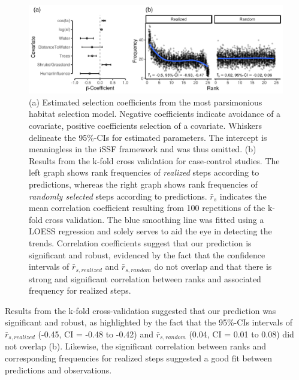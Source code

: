 \documentclass[abstract=on,10pt,a4paper,bibliography=totocnumbered]{scrartcl}
\begin{document}
\begin{figure}[h]
  \begin{center}
    \includegraphics[width = \textwidth]{99_PermeabilityResults.pdf}
    \caption{(a) Estimated selection coefficients from the most parsimonious
    habitat selection model. Negative coefficients indicate avoidance of a
    covariate, positive coefficients selection of a covariate. Whiskers
    delineate the 95\%-CIs for estimated parameters. The intercept is
    meaningless in the iSSF framework and was thus omitted. (b) Results from the
    k-fold cross validation for case-control studies. The left graph shows rank
    frequencies of \textit{realized} steps according to predictions, whereas the
    right graph shows rank frequencies of \textit{randomly selected} steps
    according to predictions. \(\bar{r}_s\) indicates the mean correlation
    coefficient resulting from 100 repetitions of the k-fold cross validation.
    The blue smoothing line was fitted using a LOESS regression and solely
    serves to aid the eye in detecting the trends. Correlation coefficients
    suggest that our prediction is significant and robust, evidenced by the fact
    that the confidence intervals of \(\bar{r}_{s, realized}\) and \(\bar{r}_{s,
    random}\) do not overlap and that there is strong and significant
    correlation between ranks and associated frequency for realized steps.}
    \label{PermeabilityResults}
  \end{center}
\end{figure}

\newpage
\noindent Results from the k-fold cross-validation suggested that our prediction
was significant and robust, as highlighted by the fact that the 95\%-CIs
intervals of \(\bar{r}_{s, realized}\) (-0.45, CI = -0.48 to -0.42) and
\(\bar{r}_{s, random}\) (0.04, CI = 0.01 to 0.08) did not overlap
(b). Likewise, the significant correlation between
ranks and corresponding frequencies for realized steps suggested a good fit
between predictions and observations.
\end{document}
